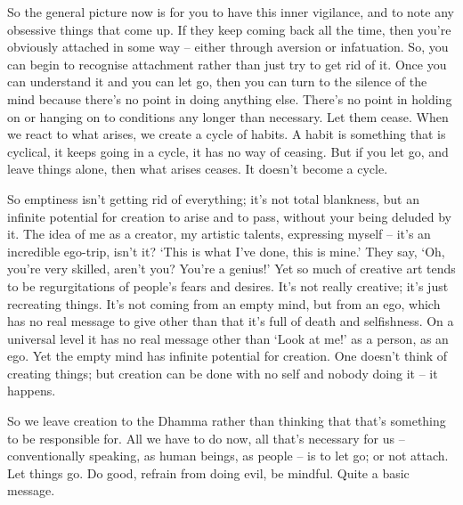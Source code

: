 So the general picture now is for you to have this inner vigilance, and to note any obsessive things that come up. If they keep coming back all the time, then you're obviously attached in some way -- either through aversion or infatuation. So, you can begin to recognise attachment rather than just try to get rid of it. Once you can understand it and you can let go, then you can turn to the silence of the mind because there's no point in doing anything else. There's no point in holding on or hanging on to conditions any longer than necessary. Let them cease. When we react to what arises, we create a cycle of habits. A habit is something that is cyclical, it keeps going in a cycle, it has no way of ceasing. But if you let go, and leave things alone, then what arises ceases. It doesn't become a cycle.

So emptiness isn't getting rid of everything; it's not total blankness, but an infinite potential for creation to arise and to pass, without your being deluded by it. The idea of me as a creator, my artistic talents, expressing myself -- it's an incredible ego-trip, isn't it? `This is what I've done, this is mine.' They say, `Oh, you're very skilled, aren't you? You're a genius!' Yet so much of creative art tends to be regurgitations of people's fears and desires. It's not really creative; it's just recreating things. It's not coming from an empty mind, but from an ego, which has no real message to give other than that it's full of death and selfishness. On a universal level it has no real message other than `Look at me!' as a person, as an ego. Yet the empty mind has infinite potential for creation. One doesn't think of creating things; but creation can be done with no self and nobody doing it -- it happens.

So we leave creation to the Dhamma rather than thinking that that's something to be responsible for. All we have to do now, all that's necessary for us -- conventionally speaking, as human beings, as people -- is to let go; or not attach. Let things go. Do good, refrain from doing evil, be mindful. Quite a basic message.


